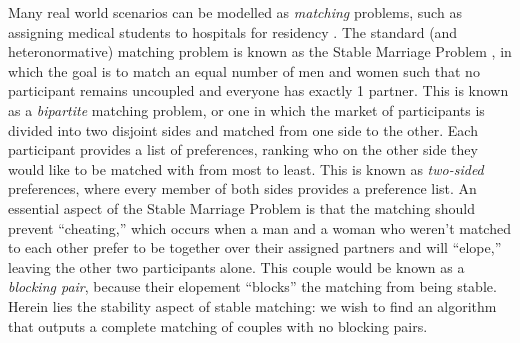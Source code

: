 Many real world scenarios can be modelled as \textit{matching} problems, such as
assigning medical students to hospitals for residency \cite{nrmp}. The
standard (and heteronormative) matching problem is known as the Stable Marriage
Problem \cite{princeton-marriage}, in which the goal is to match an equal number
of men and women such that no participant remains uncoupled and everyone has
exactly 1 partner.  This is known as a
\textit{bipartite} matching problem, or one in which the market of participants
is divided into two disjoint sides and matched from one side to the other. Each
participant provides a list of preferences, ranking who on the other side they
would like to be matched with from most to least. This is known as
\textit{two-sided} preferences, where every member of both sides provides a
preference list. An essential aspect of the Stable Marriage
Problem is that the matching should prevent “cheating,” which occurs when a man
and a woman who weren’t matched to each other prefer to be together over their
assigned partners and will “elope,” leaving the other two participants alone.
This couple would be known as a \textit{blocking pair}, because their elopement
“blocks” the matching from being stable. Herein lies the stability aspect of
stable matching: we wish to find an algorithm that outputs a complete matching
of couples with no blocking pairs.

